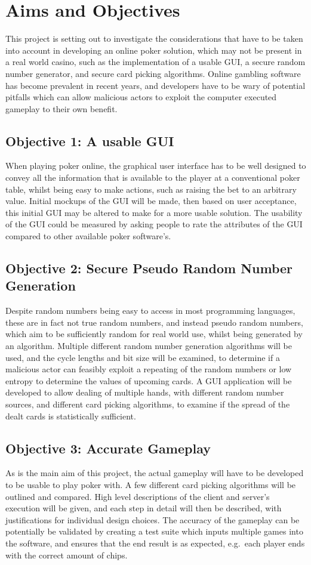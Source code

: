 \section{Aims and Objectives}
This project is setting out to investigate the considerations that have to be
taken into account in developing an online poker solution, which may not be
present in a real world casino, such as the implementation of a usable GUI, 
a secure random number generator, and secure card picking algorithms. Online 
gambling software has become prevalent in recent years, and developers have to 
be wary of potential pitfalls which can allow malicious actors to exploit the 
computer executed gameplay to their own benefit.

\subsection{Objective 1: A usable GUI}
When playing poker online, the graphical user interface has to be well designed
to convey all the information that is available to the player at a conventional
poker table, whilst being easy to make actions, such as raising the bet to
an arbitrary value. Initial mockups of the GUI will be made, then based on
user acceptance, this initial GUI may be altered to make for a more usable
solution. The usability of the GUI could be measured by asking people to rate
the attributes of the GUI compared to other available poker software's.

\subsection{Objective 2: Secure Pseudo Random Number Generation}
Despite random numbers being easy to access in most programming languages, 
these are in fact not true random numbers, and instead pseudo random numbers, 
which aim to be sufficiently random for real world use, whilst being generated 
by an algorithm. Multiple different random number generation algorithms will
be used, and the cycle lengths and bit size will be examined, to determine if 
a malicious actor can feasibly exploit a repeating of the random numbers or 
low entropy to determine the values of upcoming cards. A GUI application will
be developed to allow dealing of multiple hands, with different random number
sources, and different card picking algorithms, to examine if the spread of
the dealt cards is statistically sufficient.

\subsection{Objective 3: Accurate Gameplay}
As is the main aim of this project, the actual gameplay will have to be
developed to be usable to play poker with. A few different card picking
algorithms will be outlined and compared. High level descriptions of the
client and server's execution will be given, and each step in detail will
then be described, with justifications for individual design choices. The
accuracy of the gameplay can be potentially be validated by creating a test
suite which inputs multiple games into the software, and ensures that the
end result is as expected, e.g.\ each player ends with the correct amount of
chips.
